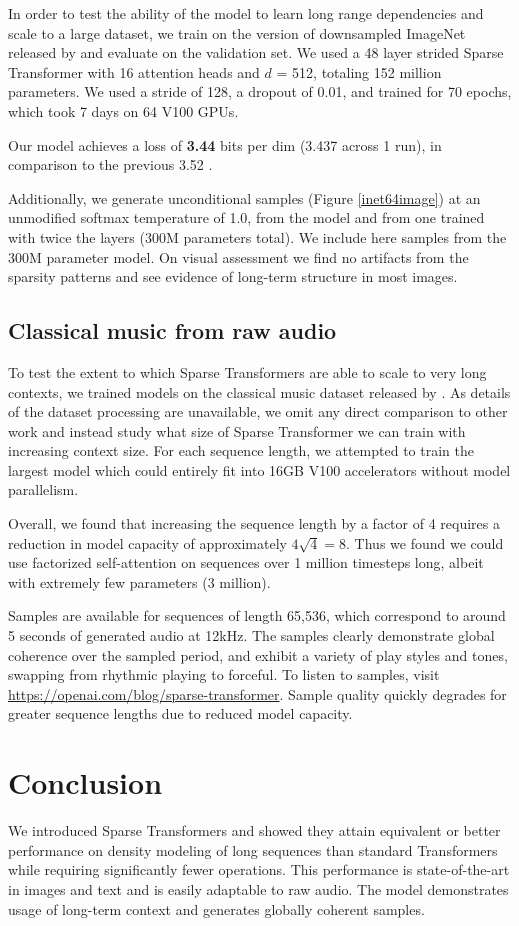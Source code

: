 In order to test the ability of the model to learn long range dependencies and scale to a large dataset, we train on the version of downsampled ImageNet released by \cite{oord2016pixel} and evaluate on the validation set. We used a 48 layer strided Sparse Transformer with 16 attention heads and $d$ = 512, totaling 152 million parameters. We used a stride of 128, a dropout of 0.01, and trained for 70 epochs, which took 7 days on 64 V100 GPUs.

Our model achieves a loss of \textbf{3.44} bits per dim (3.437 across 1 run), in comparison to the previous 3.52 \cite{menick2018generating}. 

Additionally, we generate unconditional samples (Figure \ref{inet64image}) at an unmodified softmax temperature of 1.0, from the model and from one trained with twice the layers (300M parameters total). We include here samples from the 300M parameter model. On visual assessment we find no artifacts from the sparsity patterns and see evidence of long-term structure in most images. 

\subsection{Classical music from raw audio}

To test the extent to which Sparse Transformers are able to scale to very long contexts, we trained models on the classical music dataset released by \cite{dieleman2018challenge}. As details of the dataset processing are unavailable, we omit any direct comparison to other work and instead study what size of Sparse Transformer we can train with increasing context size. For each sequence length, we attempted to train the largest model which could entirely fit into 16GB V100 accelerators without model parallelism.

Overall, we found that increasing the sequence length by a factor of 4 requires a reduction in model capacity of approximately $4 \sqrt{4} = 8$. Thus we found we could use factorized self-attention on sequences over 1 million timesteps long, albeit with extremely few parameters (3 million).

Samples are available for sequences of length 65,536, which correspond to around 5 seconds of generated audio at 12kHz. The samples clearly demonstrate global coherence over the sampled period, and exhibit a variety of play styles and tones, swapping from rhythmic playing to forceful. To listen to samples, visit \url{https://openai.com/blog/sparse-transformer}. Sample quality quickly degrades for greater sequence lengths due to reduced model capacity. 

\section{Conclusion}
We introduced Sparse Transformers and showed they attain equivalent or better performance on density modeling of long sequences than standard Transformers while requiring significantly fewer operations. This performance is state-of-the-art in images and text and is easily adaptable to raw audio. The model demonstrates usage of long-term context and generates globally coherent samples.


